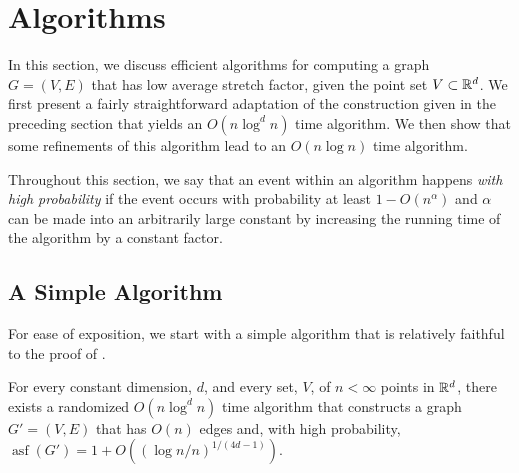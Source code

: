 \documentclass{patmorin}
\DeclareMathOperator{\asf}{asf}
\begin{document}
\section{Algorithms}

In this section, we discuss efficient algorithms for computing a graph
$G=(V,E)$ that has low average stretch factor, given the point set
$V\subset\mathbb{R}^d$.  We first present a fairly straightforward adaptation of
the construction given in the preceding section that yields an $O(n\log^d
n)$ time algorithm.  We then show that some refinements of this algorithm
lead to an $O(n\log n)$ time algorithm.

Throughout this section, we say that an event within an algorithm happens
\emph{with high probability} if the event occurs with probability at
least $1-O(n^{\alpha})$ and $\alpha$ can be made into an arbitrarily
large constant by increasing the running time of the algorithm by a
constant factor. 

\subsection{A Simple Algorithm}

For ease of exposition, we start with a simple algorithm that is
relatively faithful to the proof of .  
\begin{thm}
  For every constant dimension, $d$, and every set, $V$, of $n<\infty$
  points in $\mathbb{R}^d$, there exists a randomized $O(n\log^{d} n )$ time
  algorithm that constructs a graph $G'=(V,E)$ that has $O(n)$ edges and,
  with high probability, $\asf(G')=1+O((\log n/n)^{1/(4d-1)})$.
\end{thm}
\end{document}
